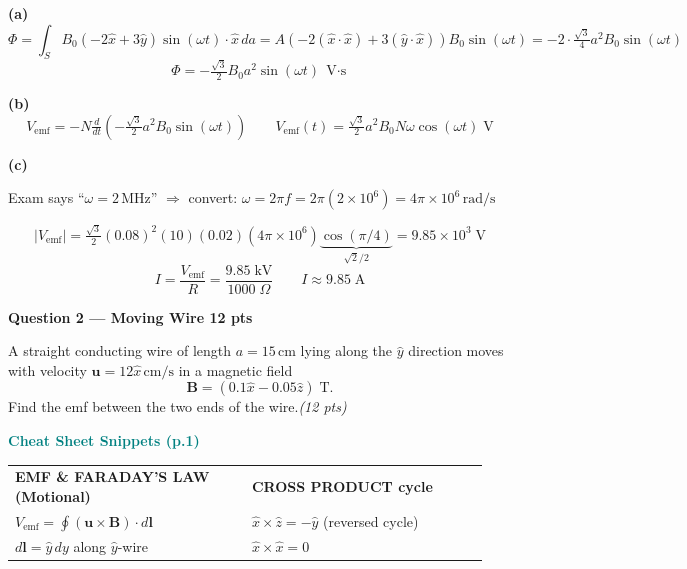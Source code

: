 \documentclass[11pt,letterpaper]{article}
\begin{document}
\textbf{(a)}
\[
\Phi=\int_S B_0(-2\hat{x}+3\hat{y})\sin(\omega t)\cdot\hat{x}\,da
=A\!\left(-2(\hat{x}\cdot\hat{x})+3(\hat{y}\cdot\hat{x})\right)B_0\sin(\omega t)
=-2\cdot\tfrac{\sqrt{3}}{4}a^2 B_0\sin(\omega t)
\]
\[\boxed{\Phi=-\tfrac{\sqrt{3}}{2}B_0 a^2\sin(\omega t)\;\text{V$\cdot$s}}\]

\textbf{(b)}
\[V_\text{emf}=-N\tfrac{d}{dt}\!\left(-\tfrac{\sqrt{3}}{2}a^2 B_0\sin(\omega t)\right)
\qquad\boxed{V_\text{emf}(t)=\tfrac{\sqrt{3}}{2}a^2 B_0 N\omega\cos(\omega t)\;\text{V}}\]

\textbf{(c)}
\begin{notebox}
Exam says ``$\omega=2\,\text{MHz}$'' $\Rightarrow$ convert: $\omega=2\pi f=2\pi(2\times10^6)=4\pi\times10^6\,\text{rad/s}$
\end{notebox}
\[|V_\text{emf}|=\tfrac{\sqrt{3}}{2}(0.08)^2(10)(0.02)(4\pi\times10^6)\underbrace{\cos(\pi/4)}_{\sqrt{2}/2}=9.85\times10^3\;\text{V}\]
\[I=\frac{V_\text{emf}}{R}=\frac{9.85\;\text{kV}}{1000\;\Omega}\qquad\boxed{I\approx9.85\;\text{A}}\]

\newpage
\colorbox{purplebg}{\parbox{\dimexpr\linewidth-2\fboxsep}{\color{purple}\large\textbf{Question 2 --- Moving Wire \hfill 12 pts}}}

\begin{qbox}
A straight conducting wire of length $a=15\,\text{cm}$ lying along the $\hat{y}$ direction moves with velocity $\mathbf{u}=12\hat{x}\,\text{cm/s}$ in a magnetic field
\[\mathbf{B}=(0.1\hat{x}-0.05\hat{z})\;\text{T}.\]
Find the emf between the two ends of the wire.\hfill\textit{(12 pts)}
\end{qbox}

\begin{cssnip}
\textbf{\small\textcolor{teal}{Cheat Sheet Snippets (p.1)}}\\[3pt]
\begin{tabular}{@{}p{0.47\linewidth}p{0.47\linewidth}@{}}
\textbf{EMF \& FARADAY'S LAW (Motional)} & \textbf{CROSS PRODUCT cycle}\\
$V_\text{emf}=\displaystyle\oint(\mathbf{u}\times\mathbf{B})\cdot d\mathbf{l}$ &
$\hat{x}\times\hat{z}=-\hat{y}$ (reversed cycle)\\
$d\mathbf{l}=\hat{y}\,dy$ along $\hat{y}$-wire & $\hat{x}\times\hat{x}=0$
\end{tabular}
\end{cssnip}
\end{document}
